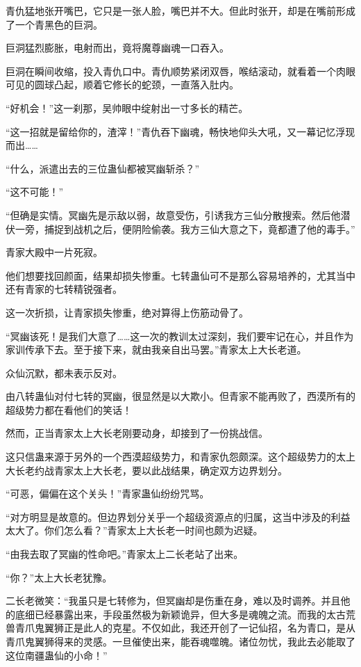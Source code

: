\begin{this_body}
青仇猛地张开嘴巴，它只是一张人脸，嘴巴并不大。但此时张开，却是在嘴前形成了一个青黑色的巨洞。

巨洞猛烈膨胀，电射而出，竟将魔尊幽魂一口吞入。

巨洞在瞬间收缩，投入青仇口中。青仇顺势紧闭双唇，喉结滚动，就看着一个肉眼可见的圆球凸起，顺着它修长的蛇颈，一直落入肚内。

“好机会！”这一刹那，吴帅眼中绽射出一寸多长的精芒。

“这一招就是留给你的，渣滓！”青仇吞下幽魂，畅快地仰头大吼，又一幕记忆浮现而出……

“什么，派遣出去的三位蛊仙都被冥幽斩杀？”

“这不可能！”

“但确是实情。冥幽先是示敌以弱，故意受伤，引诱我方三仙分散搜索。然后他潜伏一旁，捕捉到战机之后，便阴险偷袭。我方三仙大意之下，竟都遭了他的毒手。”

青家大殿中一片死寂。

他们想要找回颜面，结果却损失惨重。七转蛊仙可不是那么容易培养的，尤其当中还有青家的七转精锐强者。

这一次折损，让青家损失惨重，绝对算得上伤筋动骨了。

“冥幽该死！是我们大意了……这一次的教训太过深刻，我们要牢记在心，并且作为家训传承下去。至于接下来，就由我亲自出马罢。”青家太上大长老道。

众仙沉默，都未表示反对。

由八转蛊仙对付七转的冥幽，很显然是以大欺小。但青家不能再败了，西漠所有的超级势力都在看他们的笑话！

然而，正当青家太上大长老刚要动身，却接到了一份挑战信。

这只信蛊来源于另外的一个西漠超级势力，和青家仇怨颇深。这个超级势力的太上大长老约战青家太上大长老，要以此战结果，确定双方边界划分。

“可恶，偏偏在这个关头！”青家蛊仙纷纷咒骂。

“对方明显是故意的。但边界划分关乎一个超级资源点的归属，这当中涉及的利益太大了。你们怎么看？”青家太上大长老一时间也颇为迟疑。

“由我去取了冥幽的性命吧。”青家太上二长老站了出来。

“你？”太上大长老犹豫。

二长老微笑：“我虽只是七转修为，但冥幽却是伤重在身，难以及时调养。并且他的底细已经暴露出来，手段虽然极为新颖诡异，但大多是魂魄之流。而我的太古荒兽青爪鬼翼狮正是此人的克星。不仅如此，我还开创了一记仙招，名为青口，是从青爪鬼翼狮得来的灵感。一旦催使出来，能吞魂噬魄。诸位勿忧，我此去必能取了这位南疆蛊仙的小命！”


\end{this_body}
